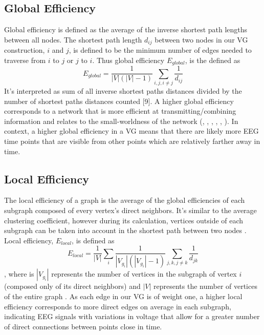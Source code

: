 \documentclass[Afour,times,sageh]{sagej}
\begin{document}
\subsection{Global Efficiency}
Global efficiency is defined as the average of the inverse shortest path lengths between all nodes. The shortest path length $d_{ij}$ between two nodes in our VG construction, $i$ and $j$, is defined to be the minimum number of edges needed to traverse from $i$ to $j$ or $j$ to $i$. Thus global efficiency $E_{global}$, is the defined as  $$E_{global} = \frac{1}{|V|(|V| - 1)} \sum_{i, j, i \neq j} \frac{1}{d_{ij}}$$ It's interpreted as sum of all inverse shortest paths distances divided by the number of shortest paths distances counted [9]. A higher global efficiency corresponds to a network that is more efficient at transmitting/combining information and relates to the small-worldness of the network (\citet{Wang2016}, \citet{Kabbara}, \citet{Latora}, \citet{Rubinov2010}, \citet{Stam2007}, \citet{Harrington2015}). In context, a higher global efficiency in a VG means that there are likely more EEG time points that are visible from other points which are relatively farther away in time.
\subsection{Local Efficiency}
The local efficiency of a graph is the average of the global efficiencies of each subgraph composed of every vertex’s direct neighbors. It’s similar to the average clustering coefficient, however during its calculation, vertices outside of each subgraph can be taken into account in the shortest path between two nodes \citep{Wang2016}. Local efficiency, $E_{local}$, is defined as $$E_{local} = \frac{1}{|V|} \sum_{i} \frac{1}{|V_{g_i}|(|V_{g_i}| - 1)} \sum_{j, k, j \neq k} \frac{1}{d_{jk}} $$, where is $|V_{g_i}|$ represents the number of vertices in the subgraph of vertex $i$ (composed only of its direct neighbors) and $|V|$ represents the number of vertices of the entire graph \citep{Latora}. As each edge in our VG is of weight one, a higher local efficiency corresponds to more direct edges on average in each subgraph, indicating EEG signals with variations in voltage that allow for a greater number of direct connections between points close in time.
\end{document}
